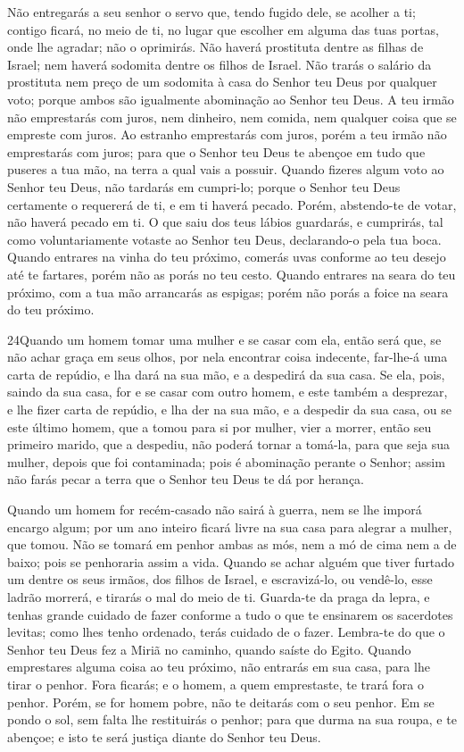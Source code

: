 Não entregarás a seu senhor o servo que, tendo fugido dele, se
acolher a ti; contigo ficará, no meio de ti, no lugar que
escolher em alguma das tuas portas, onde lhe agradar; não o
oprimirás. Não haverá prostituta dentre as filhas de Israel;
nem haverá sodomita dentre os filhos de Israel. Não trarás o
salário da prostituta nem preço de um sodomita à casa do Senhor teu
Deus por qualquer voto; porque ambos são igualmente abominação ao
Senhor teu Deus. A teu irmão não emprestarás com juros, nem
dinheiro, nem comida, nem qualquer coisa que se empreste com juros.
Ao estranho emprestarás com juros, porém a teu irmão não
emprestarás com juros; para que o Senhor teu Deus te abençoe em tudo
que puseres a tua mão, na terra a qual vais a possuir. Quando
fizeres algum voto ao Senhor teu Deus, não tardarás em cumpri-lo;
porque o Senhor teu Deus certamente o requererá de ti, e em ti
haverá pecado. Porém, abstendo-te de votar, não haverá pecado
em ti. O que saiu dos teus lábios guardarás, e cumprirás, tal
como voluntariamente votaste ao Senhor teu Deus, declarando-o pela
tua boca. Quando entrares na vinha do teu próximo, comerás
uvas conforme ao teu desejo até te fartares, porém não as porás no
teu cesto. Quando entrares na seara do teu próximo, com a tua
mão arrancarás as espigas; porém não porás a foice na seara do teu
próximo.


\medskip

\lettrine{24} Quando um homem tomar uma mulher e se casar com
ela, então será que, se não achar graça em seus olhos, por nela
encontrar coisa indecente, far-lhe-á uma carta de repúdio, e lha
dará na sua mão, e a despedirá da sua casa. Se ela, pois, saindo
da sua casa, for e se casar com outro homem, e este também a
desprezar, e lhe fizer carta de repúdio, e lha der na sua mão, e a
despedir da sua casa, ou se este último homem, que a tomou para si
por mulher, vier a morrer, então seu primeiro marido, que a
despediu, não poderá tornar a tomá-la, para que seja sua mulher,
depois que foi contaminada; pois é abominação perante o Senhor;
assim não farás pecar a terra que o Senhor teu Deus te dá por
herança.

Quando um homem for recém-casado não sairá à guerra, nem se lhe
imporá encargo algum; por um ano inteiro ficará livre na sua casa
para alegrar a mulher, que tomou. Não se tomará em penhor ambas
as mós, nem a mó de cima nem a de baixo; pois se penhoraria assim a
vida. Quando se achar alguém que tiver furtado um dentre os seus
irmãos, dos filhos de Israel, e escravizá-lo, ou vendê-lo, esse
ladrão morrerá, e tirarás o mal do meio de ti. Guarda-te da
praga da lepra, e tenhas grande cuidado de fazer conforme a tudo o
que te ensinarem os sacerdotes levitas; como lhes tenho ordenado,
terás cuidado de o fazer. Lembra-te do que o Senhor teu Deus fez
a Miriã no caminho, quando saíste do Egito. Quando
emprestares alguma coisa ao teu próximo, não entrarás em sua casa,
para lhe tirar o penhor. Fora ficarás; e o homem, a quem
emprestaste, te trará fora o penhor. Porém, se for homem
pobre, não te deitarás com o seu penhor. Em se pondo o sol,
sem falta lhe restituirás o penhor; para que durma na sua roupa, e
te abençoe; e isto te será justiça diante do Senhor teu Deus.

